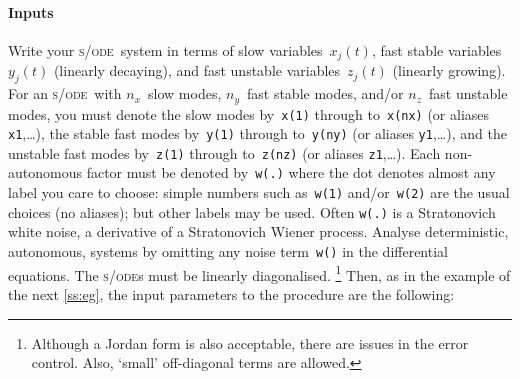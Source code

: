 \documentclass[11pt,a5paper]{article}
\def\sde{\textsc{s/ode}}
\begin{document}
\paragraph{Inputs}
Write your \sde\ system in terms of slow
variables~\(x_j(t)\), fast stable variables~\(y_j(t)\)
(linearly decaying), and fast unstable variables~\(z_j(t)\)
(linearly growing).  For an \sde\ with $n_x$~slow modes,
$n_y$~fast stable modes, and/or \(n_z\)~fast unstable modes,
you must denote the slow modes by~\verb|x(1)| through
to~\verb|x(nx)| (or aliases \verb|x1|,\ldots), the stable
fast modes by~\verb|y(1)| through to~\verb|y(ny)| (or
aliases \verb|y1|,\ldots), and the unstable fast modes
by~\verb|z(1)| through to~\verb|z(nz)| (or aliases
\verb|z1|,\ldots). Each non-autonomous factor must be
denoted by~\verb|w(.)| where the dot denotes almost any
label you care to choose: simple numbers such as~\verb|w(1)|
and/or~\verb|w(2)| are the usual choices (no aliases); but
other labels may be used. Often \verb|w(.)| is a
Stratonovich white noise, a derivative of a Stratonovich
Wiener process. Analyse deterministic, autonomous, systems
by omitting any noise term~\verb|w()| in the differential
equations. The \sde{}s must be linearly diagonalised.
\footnote{Although a Jordan form is also acceptable, there
are issues in the error control.  Also, `small' off-diagonal
terms are allowed.}  Then, as in the example of the next
\cref{ss:eg}, the input parameters to the procedure are the
following:
\end{document}
